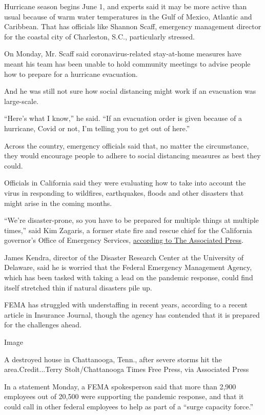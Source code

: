 Hurricane season begins June 1, and experts said it may be more active
than usual because of warm water temperatures in the Gulf of Mexico,
Atlantic and Caribbean. That has officials like Shannon Scaff, emergency
management director for the coastal city of Charleston, S.C.,
particularly stressed.

On Monday, Mr. Scaff said coronavirus-related stay-at-home measures have
meant his team has been unable to hold community meetings to advise
people how to prepare for a hurricane evacuation.

And he was still not sure how social distancing might work if an
evacuation was large-scale.

``Here's what I know,'' he said. ``If an evacuation order is given
because of a hurricane, Covid or not, I'm telling you to get out of
here.''

Across the country, emergency officials said that, no matter the
circumstance, they would encourage people to adhere to social distancing
measures as best they could.

Officials in California said they were evaluating how to take into
account the virus in responding to wildfires, earthquakes, floods and
other disasters that might arise in the coming months.

``We're disaster-prone, so you have to be prepared for multiple things
at multiple times,'' said Kim Zagaris, a former state fire and rescue
chief for the California governor's Office of Emergency Services,
\href{https://ktla.com/news/california/california-agencies-trying-to-figure-out-earthquake-wildfire-flood-evacuation-plans-amid-pandemic/}{according
to The Associated Press}.

James Kendra, director of the Disaster Research Center at the University
of Delaware, said he is worried that the Federal Emergency Management
Agency, which has been tasked with taking a lead on the pandemic
response, could find itself stretched thin if natural disasters pile up.

FEMA has struggled with understaffing in recent years, according to a
recent article in Insurance Journal, though the agency has contended
that it is prepared for the challenges ahead.

Image

A destroyed house in Chattanooga, Tenn., after severe storms hit the
area.Credit...Terry Stolt/Chattanooga Times Free Press, via Associated
Press

In a statement Monday, a FEMA spokesperson said that more than 2,900
employees out of 20,500 were supporting the pandemic response, and that
it could call in other federal employees to help as part of a ``surge
capacity force.''


